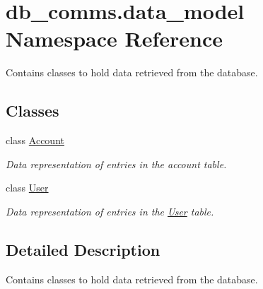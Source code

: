 \hypertarget{namespacedb__comms_1_1data__model}{}\section{db\+\_\+comms.\+data\+\_\+model Namespace Reference}
\label{namespacedb__comms_1_1data__model}


Contains classes to hold data retrieved from the database.  


\subsection*{Classes}
\begin{DoxyCompactItemize}
\item 
class \hyperlink{classdb__comms_1_1data__model_1_1_account}{Account}
\begin{DoxyCompactList}\small\item\em Data representation of entries in the account table. \end{DoxyCompactList}\item 
class \hyperlink{classdb__comms_1_1data__model_1_1_user}{User}
\begin{DoxyCompactList}\small\item\em Data representation of entries in the \hyperlink{classdb__comms_1_1data__model_1_1_user}{User} table. \end{DoxyCompactList}\end{DoxyCompactItemize}


\subsection{Detailed Description}
Contains classes to hold data retrieved from the database. 